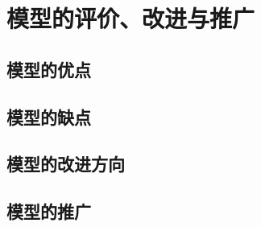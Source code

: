 \documentclass[bwprint]{gmcmthesis}
\numberwithin{equation}{section}
\numberwithin{figure}{section}
\numberwithin{table}{section}
\begin{document}


\clearpage
\section{模型的评价、改进与推广}

%

\subsection{模型的优点}

\subsection{模型的缺点}

\subsection{模型的改进方向}

\subsection{模型的推广}





\end{document}
